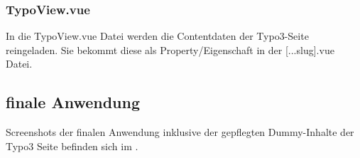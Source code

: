 \subsubsection{TypoView.vue}
\label{sec:TypoView.vue}

In die TypoView.vue Datei werden die Contentdaten der Typo3-Seite reingeladen. Sie bekommt diese als Property/Eigenschaft in der [...slug].vue Datei.

\subsection{finale Anwendung}
\label{sec:finale Anwendung}

Screenshots der finalen Anwendung inklusive der gepflegten Dummy-Inhalte der Typo3 Seite befinden sich im .
